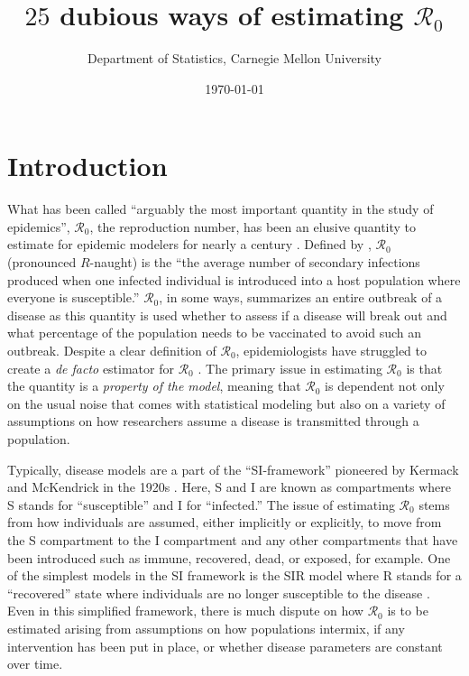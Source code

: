 \documentclass[12pt]{article}
\newcommand{\XX}{\ensuremath{25}} %
\newcommand{\rr}{\ensuremath{\mathcal{R}_0}}
\begin{document}
\title{$\XX$ dubious ways of estimating $\rr$}
\author{ Department of Statistics, Carnegie Mellon University}
\date{\today}
\maketitle


\section{Introduction}\label{sec:intro}
What has been called ``arguably the most important quantity in the study of epidemics'', $\mathcal{R}_0$, the reproduction number, has been an elusive quantity to estimate for epidemic modelers for nearly a century \citep{Heesterbeek2002}.  Defined by \citet{anderson1992}, $\rr$ (pronounced $R$-naught) is the ``the average number of secondary infections produced when one infected individual is introduced into a host population where everyone is susceptible.''  $\rr$, in some ways, summarizes an entire outbreak of a disease as this quantity is used whether to assess if a disease will break out and what percentage of the population needs to be vaccinated to avoid such an outbreak.  Despite a clear definition of $\rr$, epidemiologists have struggled to create a \textit{de facto} estimator for $\rr$  \citep{hethcote2000}.  The primary issue in estimating $\rr$ is that the quantity is a \textit{property of the model}, meaning that $\rr$ is dependent not only on the usual noise that comes with statistical modeling but also on a variety of assumptions on how researchers assume a disease is transmitted through a population.

Typically, disease models are a part of the ``SI-framework'' pioneered by Kermack and McKendrick in the 1920s \citep{getz2006}.  Here, S and I are known as compartments where S stands for ``susceptible'' and I for ``infected.''  The issue of estimating $\rr$ stems from how individuals are assumed, either implicitly or explicitly, to move from the S compartment to the I compartment and any other compartments that have been introduced such as immune, recovered, dead, or exposed, for example.  One of the simplest models in the SI framework is the SIR model where R stands for a ``recovered'' state where individuals are no longer susceptible to the disease \citep{Kermack700}.  Even in this simplified framework, there is much dispute on how $\rr$ is to be estimated arising from assumptions on how populations intermix, if any intervention has been put in place, or whether disease parameters are constant over time.
\end{document}
